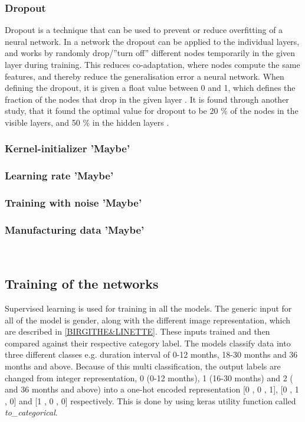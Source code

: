 \subsubsection{Dropout}
Dropout is a technique that can be used to prevent or reduce overfitting of a neural network. In a network the dropout can be applied to the individual layers, and works by randomly drop/”turn off” different nodes temporarily in the given layer during training. 
This reduces co-adaptation, where nodes compute the same features, and thereby reduce the generalisation error a neural network.\citep{Srivastava2014}  
When defining the dropout, it is given a float value between 0 and 1, which defines the fraction of the nodes that drop in the given layer \citep{Chollet2015}.
It is found through another study, that it found the optimal value for dropout to be 20 \% of the nodes in the visible layers, and 50 \% in the hidden layers \citep{Srivastava2014}.



\subsubsection{Kernel-initializer 'Maybe'}


\subsubsection{Learning rate 'Maybe'}

\subsubsection{Training with noise 'Maybe'}

\subsubsection{Manufacturing data 'Maybe'}

\ 
 
 
\subsection{Training of the networks}
Supervised learning is used for training in all the models. The generic input for all of the model is gender, along with the different image representation, which are described in \autoref{BIRGITHE&LINETTE}. These inputs trained and then compared against their respective category label.   
The models classify data into three different classes e.g. duration interval of 0-12 months, 18-30 months and 36 months and above. Because of this multi classification, the output labels are changed from integer representation, 0 (0-12 months), 1 (16-30 months) and 2 ( and 36 months and above) into a one-hot encoded representation [0 , 0 , 1], [0 , 1 , 0] and [1 , 0 , 0] respectively. This is done by using keras utility function called \textit{to_categorical}. 

